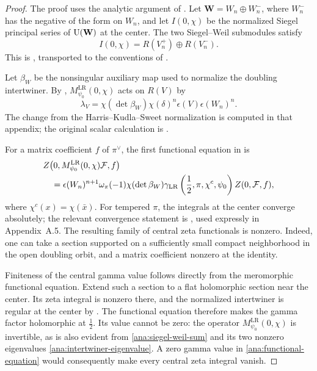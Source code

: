 \begin{proof}
The proof uses the analytic argument of \cite[Appendix~A.5]{GanIchinoFormal}.
Let $\mathbf W=W_n\oplus W_n^{-}$, where $W_n^{-}$ has the negative
of the form on $W_n$, and let $I(0,\chi)$ be the normalized Siegel
principal series of $\operatorname{U}(\mathbf W)$ at the center.
The two Siegel--Weil submodules satisfy
\begin{equation}\label{ana:siegel-weil-sum}
 I(0,\chi)=R(V_n^+)\oplus R(V_n^-).
\end{equation}
This is \cite[Proposition~4.1(ii), p.~961]{HKS96}, transported to
the conventions of \cite{GanIchinoFormal}.

Let $\beta_W$ be the nonsingular auxiliary map used to normalize the
doubling intertwiner. By \cite[Appendix~A.4, Lemma~A.3]{GanIchinoFormal},
$M^{\mathrm{LR}}_{\psi_0}(0,\chi)$ acts on $R(V)$ by
\begin{equation}\label{ana:intertwiner-eigenvalue}
 \lambda_V
  =\chi(\det\beta_W)\chi(\delta)^n
        \epsilon(V)\epsilon(W_n)^n.
\end{equation}
The change from the Harris--Kudla--Sweet normalization is computed
in that appendix; the original scalar calculation is
\cite[Proposition~6.8, p.~974]{HKS96}.

For a matrix coefficient $f$ of $\pi^\vee$, the first functional
equation in \cite[Appendix~A.5]{GanIchinoFormal} is
\begin{align}
 &Z\bigl(0,M^{\mathrm{LR}}_{\psi_0}(0,\chi)\mathcal F,f\bigr)
 \notag\\
 &\quad=
   \epsilon(W_n)^{n+1}\omega_\pi(-1)\chi(\det\beta_W)
   \gamma_{\mathrm{LR}}\left(\frac12,\pi,\chi^c,\psi_0\right)
   Z(0,\mathcal F,f),
 \label{ana:functional-equation}
\end{align}
where $\chi^c(x)=\chi(\bar x)$.
For tempered $\pi$, the integrals at the center converge absolutely;
the relevant convergence statement is
\cite[Lemma~9.5(ii)]{GanIchinoFormal}, used expressly in Appendix~A.5.
The resulting family of central zeta functionals is nonzero. Indeed,
one can take a section supported on a sufficiently small compact
neighborhood in the open doubling orbit, and a matrix coefficient
nonzero at the identity.

Finiteness of the central gamma value follows
directly from the meromorphic functional equation. Extend such a
section to a flat holomorphic section near the center. Its zeta
integral is nonzero there, and the normalized intertwiner is regular
at the center by \cite[Proposition~8.1 and Appendix~A]{GanIchinoFormal}.
The functional equation therefore makes the gamma factor holomorphic
at $\tfrac12$. Its value cannot be zero: the operator
$M^{\mathrm{LR}}_{\psi_0}(0,\chi)$ is invertible, as is also evident
from \eqref{ana:siegel-weil-sum} and its two nonzero eigenvalues
\eqref{ana:intertwiner-eigenvalue}. A zero gamma value in
\eqref{ana:functional-equation} would consequently make every
central zeta integral vanish.


\end{proof}
